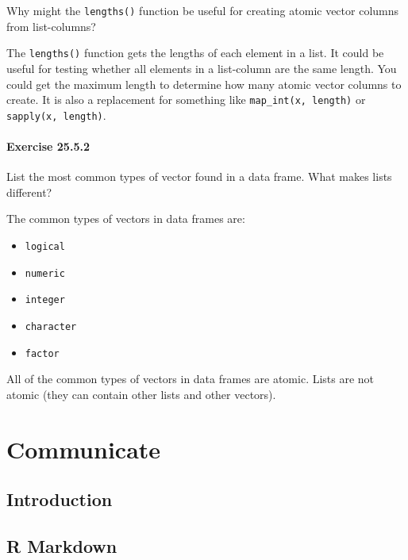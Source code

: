 \documentclass[]{book}
\providecommand{\tightlist}{%
  \setlength{\itemsep}{0pt}\setlength{\parskip}{0pt}}
\theoremstyle{plain}
\theoremstyle{remark}
\theoremstyle{definition}
\theoremstyle{definition}
\theoremstyle{definition}
\theoremstyle{remark}
\begin{document}
Why might the \texttt{lengths()} function be useful for creating atomic
vector columns from list-columns?

The \texttt{lengths()} function gets the lengths of each element in a
list. It could be useful for testing whether all elements in a
list-column are the same length. You could get the maximum length to
determine how many atomic vector columns to create. It is also a
replacement for something like \texttt{map\_int(x,\ length)} or
\texttt{sapply(x,\ length)}.

\hypertarget{exercise-25.5.2}{%
\subsection*{\texorpdfstring{Exercise
{25.5.2}}{Exercise 25.5.2}}\label{exercise-25.5.2}}

List the most common types of vector found in a data frame. What makes
lists different?

The common types of vectors in data frames are:

\begin{itemize}
\tightlist
\item
  \texttt{logical}
\item
  \texttt{numeric}
\item
  \texttt{integer}
\item
  \texttt{character}
\item
  \texttt{factor}
\end{itemize}

All of the common types of vectors in data frames are atomic. Lists are
not atomic (they can contain other lists and other vectors).

\hypertarget{part-communicate}{%
\part{Communicate}\label{part-communicate}}

\hypertarget{communicate-intro}{%
\chapter{Introduction}\label{communicate-intro}}

\hypertarget{r-markdown}{%
\chapter{R Markdown}\label{r-markdown}}
\end{document}
